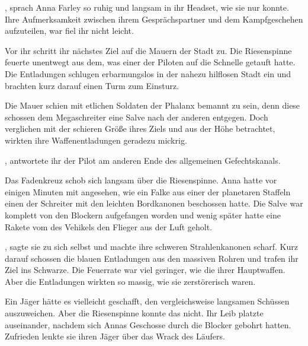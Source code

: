 , sprach Anna Farley so ruhig und langsam in ihr Headset, wie sie nur konnte. Ihre Aufmerksamkeit zwischen ihrem Gesprächspartner und dem Kampfgeschehen aufzuteilen, war fiel ihr nicht leicht.

\par

Vor ihr schritt ihr nächstes Ziel auf die Mauern der Stadt zu. Die Riesenspinne feuerte unentwegt aus dem, was einer der Piloten auf die Schnelle  getauft hatte. Die Entladungen schlugen erbarmungslos in der nahezu hilflosen Stadt ein und brachten kurz darauf einen Turm zum Einsturz.

\par

Die Mauer schien mit etlichen Soldaten der Phalanx bemannt zu sein, denn diese schossen dem Megaschreiter eine Salve nach der anderen entgegen. Doch verglichen mit der schieren Größe ihres Ziels und aus der Höhe betrachtet, wirkten ihre Waffenentladungen geradezu mickrig.

\par

, antwortete ihr der Pilot am anderen Ende des allgemeinen Gefechtskanals. 

\par

Das Fadenkreuz schob sich langsam über die Riesenspinne. Anna hatte vor einigen Minuten mit angesehen, wie ein Falke aus einer der planetaren Staffeln einen der Schreiter mit den leichten Bordkanonen beschossen hatte. Die Salve war komplett von den Blockern aufgefangen worden und wenig später hatte eine Rakete vom  des Vehikels den Flieger aus der Luft geholt.

\par

, sagte sie zu sich selbst und machte ihre schweren Strahlenkanonen scharf. Kurz darauf schossen die blauen Entladungen aus den massiven Rohren und trafen ihr Ziel ins Schwarze. Die Feuerrate war viel geringer, wie die ihrer Hauptwaffen. Aber die Entladungen wirkten so massig, wie sie zerstörerisch waren.

\par

Ein Jäger hätte es vielleicht geschafft, den vergleichsweise langsamen Schüssen auszuweichen. Aber die Riesenspinne konnte das nicht. Ihr Leib platzte auseinander, nachdem sich Annas Geschosse durch die Blocker gebohrt hatten. Zufrieden lenkte sie ihren Jäger über das Wrack des Läufers.


